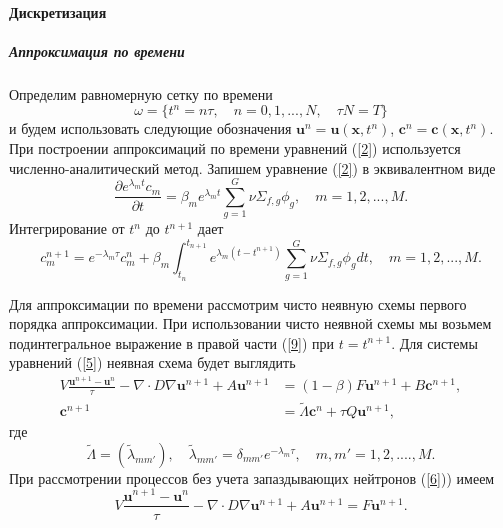 \documentclass{crm-article}
\begin{document}
\paragraph{Дискретизация}
\subparagraph{Аппроксимация по времени}
Определим равномерную сетку по времени
\[
\omega = \{ t^n=n \tau, \quad n = 0,1,...,N, \quad \tau N = T \}
\]
и будем использовать следующие обозначения $\bm{u}^n = \bm{u}(\bm{x}, t^n)$, $\bm c^n = \bm c(\bm{x}, t^n)$. 
При построении аппроксимаций по времени уравнений (\ref{2}) используется численно-аналитический метод.
Запишем уравнение (\ref{2}) в эквивалентном виде
\[
  \frac{\partial e^{\lambda_m t}  c_m}{\partial t} = \beta_m  e^{\lambda_m t} \sum_{g=1}^{G} \nu \Sigma_{f,g} \phi_g,
 \quad m = 1,2, ..., M .
\] 
Интегрирование от $t^{n}$ до $t^{n+1}$ дает
\begin{equation}\label{9}
c_m^{n+1} = e^{-\lambda_m\tau} c_m^n + \beta_m \int_{t_n}^{t_{n+1}}e^{\lambda_m (t-t^{n+1})} \sum_{g=1}^{G} \nu \Sigma_{f,g} \phi_g d t,
 \quad m = 1,2, ..., M.
\end{equation}

Для аппроксимации по времени рассмотрим чисто неявную схемы первого порядка аппроксимации. 
При использовании чисто неявной схемы мы возьмем подинтегральное выражение в правой части (\ref{9}) при $t = t^{n+1}$. 
Для системы уравнений (\ref{5}) неявная схема будет выглядить
\begin{equation}\label{10}
\begin{split}
V \frac{\bm{u}^{n+1} - \bm{u}^n}{\tau} - \nabla\cdot D \nabla\bm{u}^{n+1}  + A\bm{u}^{n+1} &=(1-\beta) F \bm{u}^{n+1} + B\bm c^{n+1},
\\
\bm{c}^{n+1} & = \widetilde{\Lambda}\bm{c}^{n} + \tau Q \bm{u}^{n+1},
\end{split}
\end{equation}
где
\[
\widetilde{\Lambda} = (\widetilde{\lambda}_{mm'}), \quad \widetilde{\lambda}_{mm'} = \delta_{mm'} e^{-\lambda_m\tau},
 \quad m, m' = 1,2, ....,M .
\]
При рассмотрении процессов без учета запаздывающих нейтронов (\ref{6})) имеем
\begin{equation}\label{11}
V \frac{\bm{u}^{n+1} - \bm{u}^n}{\tau} -\nabla \cdot D \nabla \bm{u}^{n+1} + A \bm{u}^{n+1} = F \bm{u}^{n+1}.
\end{equation}
\end{document}
